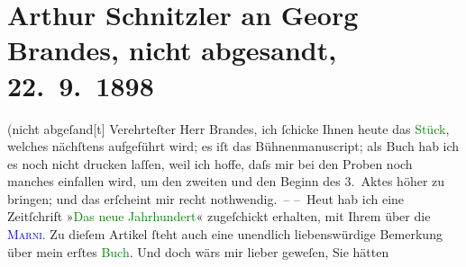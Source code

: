 

               \section[Arthur Schnitzler an Georg Brandes, nicht abgesandt, 22. 9. 1898]{ Arthur Schnitzler an Georg Brandes, nicht abgesandt,
                    22. 9. 1898}\nopagebreak{}\rehead{ }\normalsize\beginnumbering{} \toendnotes[C]{\smallbreak\pagebreak[2]} 
\toendnotes[C]{\smallbreak}\pstart
           \noindent{} (nicht abgeſand{[}t{]}\pend
           \pstart{}{\pb}Verehrteſter Herr Brandes,\pend\pstart
           ich ſchicke Ihnen heute das \textcolor{green}{Stück}{}, welches nächſtens aufgeführt wird; es iſt das Bühnenmanuscript;
                    als Buch hab ich es noch nicht drucken laſſen, weil ich hoffe, daſs mir bei den
                    Proben noch manches einfallen wird, um den zweiten und den Beginn des 3. Aktes
                    höher zu bringen; und das erſcheint mir recht nothwendig. –\pend
           \pstart
           – Heut hab ich eine Zeitſchrift »\textcolor{green}{Das neue
                        Jahrhundert}{}\ledrightnote{\textcolor{green}{Das neue Jahrhundert}}« zugeſchickt erhalten, mit Ihrem \label{K_L00848_1v}\label{K_L00848_1h} über die \textcolor{blue}{\textsc{Marni}}{}\ledrightnote{\textcolor{blue}{Jeanne Marni}}. {\pb}Zu dieſem Artikel ſteht auch eine
                    unendlich liebenswürdige Bemerkung über mein erſtes \textcolor{green}{Buch}{}. Und doch wärs mir lieber geweſen, Sie hätten
